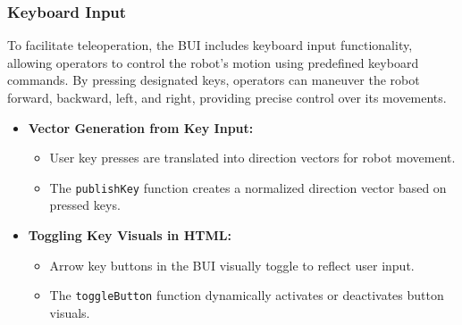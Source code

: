 \documentclass{article}
\begin{document}
    \subsubsection{Keyboard Input}
    To facilitate teleoperation, the BUI includes keyboard input functionality, allowing operators to control the robot's motion using predefined keyboard commands. By pressing designated keys, operators can maneuver the robot forward, backward, left, and right, providing precise control over its movements.
    \begin{itemize}
    \item \textbf{Vector Generation from Key Input:}
        \begin{itemize}
            \item User key presses are translated into direction vectors for robot movement.
            \item The \texttt{publishKey} function creates a normalized direction vector based on pressed keys.
        \end{itemize}
        
    \item \textbf{Toggling Key Visuals in HTML:}
        \begin{itemize}
            \item Arrow key buttons in the BUI visually toggle to reflect user input.
            \item The \texttt{toggleButton} function dynamically activates or deactivates button visuals.
        \end{itemize}
    \end{itemize}
    
\end{document}
